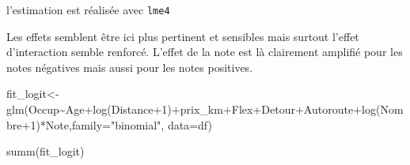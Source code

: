 \documentclass[
]{book}
\newenvironment{Shaded}{\begin{snugshade}}{\end{snugshade}}
\newcommand{\AttributeTok}[1]{\textcolor[rgb]{0.77,0.63,0.00}{#1}}
\newcommand{\DecValTok}[1]{\textcolor[rgb]{0.00,0.00,0.81}{#1}}
\newcommand{\FunctionTok}[1]{\textcolor[rgb]{0.00,0.00,0.00}{#1}}
\newcommand{\NormalTok}[1]{#1}
\newcommand{\OtherTok}[1]{\textcolor[rgb]{0.56,0.35,0.01}{#1}}
\newcommand{\SpecialCharTok}[1]{\textcolor[rgb]{0.00,0.00,0.00}{#1}}
\newcommand{\StringTok}[1]{\textcolor[rgb]{0.31,0.60,0.02}{#1}}
\begin{document}
l'estimation est réalisée avec \texttt{lme4}

Les effets semblent être ici plus pertinent et sensibles mais surtout l'effet d'interaction semble renforcé. L'effet de la note est là clairement amplifié pour les notes négatives mais aussi pour les notes positives.

\begin{Shaded}
\begin{Highlighting}[]
\NormalTok{fit\_logit}\OtherTok{\textless{}{-}}\FunctionTok{glm}\NormalTok{(Occup}\SpecialCharTok{\textasciitilde{}}\NormalTok{Age}\SpecialCharTok{+}\FunctionTok{log}\NormalTok{(Distance}\SpecialCharTok{+}\DecValTok{1}\NormalTok{)}\SpecialCharTok{+}\NormalTok{prix\_km}\SpecialCharTok{+}\NormalTok{Flex}\SpecialCharTok{+}\NormalTok{Detour}\SpecialCharTok{+}\NormalTok{Autoroute}\SpecialCharTok{+}\FunctionTok{log}\NormalTok{(Nombre}\SpecialCharTok{+}\DecValTok{1}\NormalTok{)}\SpecialCharTok{*}\NormalTok{Note,}\AttributeTok{family=}\StringTok{"binomial"}\NormalTok{, }\AttributeTok{data=}\NormalTok{df)}


\FunctionTok{summ}\NormalTok{(fit\_logit)}
\end{Highlighting}
\end{Shaded}
\end{document}
